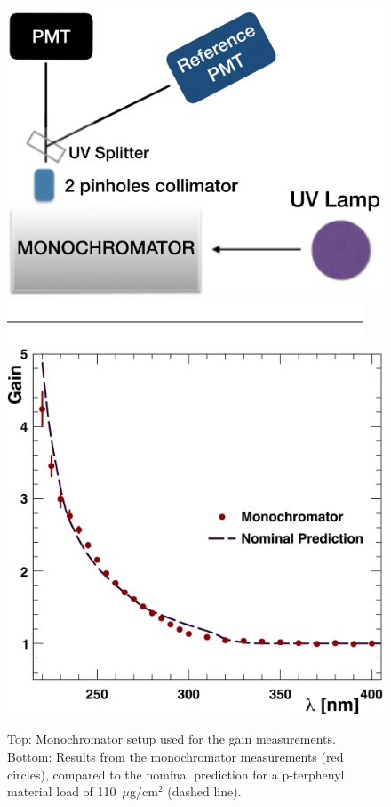 \begin{figure}[H]
	\centering
	\includegraphics[width=0.99\columnwidth, height=0.65\columnwidth]{img/pmtTestingSetup.png}
	\includegraphics[width=0.99\columnwidth, keepaspectratio]{img/blank.png}
	\includegraphics[width=0.99\columnwidth, keepaspectratio]{img/ptQEResults.png}
	\caption{Top: Monochromator setup used for the gain measurements. Bottom: Results from the monochromator
          measurements (red circles), compared to the nominal prediction for a p-terphenyl material load of
          110~$\mu$g/cm$^2$ (dashed line).}
	\label{fig:pmtTestingSetupAndptQEResults}
\end{figure}

